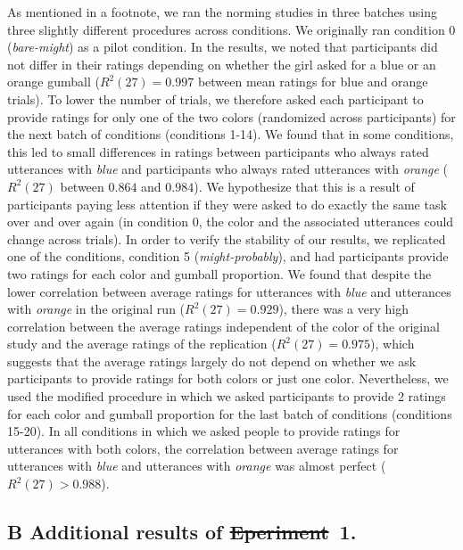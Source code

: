 \documentclass[man, floatsintext]{apa6}
\providecommand{\DIFadd}[1]{{\protect\color{blue}\uwave{#1}}} %
\providecommand{\DIFdel}[1]{{\protect\color{red}\sout{#1}}}                      %
\providecommand{\DIFaddbegin}{} %
\providecommand{\DIFaddend}{} %
\providecommand{\DIFdelbegin}{} %
\providecommand{\DIFdelend}{} %
\newcommand{\DIFscaledelfig}{0.5}
\newlength{\DIFdelgraphicswidth} %
\newlength{\DIFdelgraphicsheight} %
\newcommand{\DIFaddincludegraphics}[2][]{{\color{blue}\fbox{\DIFOincludegraphics[#1]{#2}}}} %
\newcommand{\DIFdelincludegraphics}[2][]{%
\sbox{\DIFdelgraphicsbox}{\DIFOincludegraphics[#1]{#2}}%
\settoboxwidth{\DIFdelgraphicswidth}{\DIFdelgraphicsbox} %
\settoboxtotalheight{\DIFdelgraphicsheight}{\DIFdelgraphicsbox} %
\scalebox{\DIFscaledelfig}{%
\parbox[b]{\DIFdelgraphicswidth}{\usebox{\DIFdelgraphicsbox}\\[-\baselineskip] \rule{\DIFdelgraphicswidth}{0em}}\llap{\resizebox{\DIFdelgraphicswidth}{\DIFdelgraphicsheight}{%
\setlength{\unitlength}{\DIFdelgraphicswidth}%
\begin{picture}(1,1)%
\thicklines\linethickness{2pt} %
{\color[rgb]{1,0,0}\put(0,0){\framebox(1,1){}}}%
{\color[rgb]{1,0,0}\put(0,0){\line( 1,1){1}}}%
{\color[rgb]{1,0,0}\put(0,1){\line(1,-1){1}}}%
\end{picture}%
}\hspace*{3pt}}} %
} %
\DeclareRobustCommand{\DIFaddbegin}{\DIFOaddbegin \let\includegraphics\DIFaddincludegraphics} %
\DeclareRobustCommand{\DIFaddend}{\DIFOaddend \let\includegraphics\DIFOincludegraphics} %
\DeclareRobustCommand{\DIFdelbegin}{\DIFOdelbegin \let\includegraphics\DIFdelincludegraphics} %
\DeclareRobustCommand{\DIFdelend}{\DIFOaddend \let\includegraphics\DIFOincludegraphics} %
\begin{document}
As mentioned in a footnote, we ran the norming studies in three batches using three slightly different procedures across conditions. We originally ran condition 0 (\emph{bare-might}) as a pilot condition. In the results, we noted that participants did not differ in their ratings depending on whether the girl asked for a blue or an orange gumball ($R^2(27)=0.997$ between mean ratings for blue and orange trials). To lower the number of trials, we therefore asked each participant to provide ratings for only one of the two colors (randomized across participants) for the next batch of conditions (conditions 1-14). We found that in some conditions, this led to small differences in ratings between participants who always rated utterances with \emph{blue} and participants who always rated utterances with \textit{orange} ($R^2(27)$ between $0.864$ and $0.984$). We hypothesize that this is a result of participants paying less attention if they were asked to do exactly the same task over and over again (in condition 0, the color and the associated utterances could change across trials). In order to verify the stability of our results, we replicated one of the conditions, condition 5 (\emph{might-probably}), and had participants provide two ratings for each color and gumball proportion. We found that despite the lower correlation between average ratings for utterances with \emph{blue} and utterances with \emph{orange} in the original run ($R^2(27)=0.929$), there was a very high correlation between the average ratings independent of the color of the original study and the average ratings of the replication ($R^2(27)=0.975$), which suggests that the average ratings largely do not depend on whether we ask participants to provide ratings for both colors or just one color. Nevertheless, we used the modified procedure in which we asked participants to provide 2 ratings for each color and gumball proportion for the last batch of conditions (conditions 15-20). In all conditions in which we asked people to provide ratings for utterances with both colors, the correlation between average ratings for utterances with \emph{blue} and utterances with \emph{orange} was almost perfect ($R^2(27)>0.988$).


\pagebreak
\FloatBarrier


\subsection*{B Additional results of \DIFdelbegin \DIFdel{Eperiment}\DIFdelend \DIFaddbegin \DIFadd{Experiment}\DIFaddend ~1.}
\end{document}
